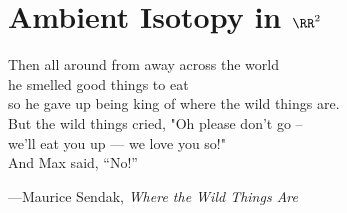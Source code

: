 \chapter{Ambient Isotopy in $\RR^2$}\label{chap:ambient-isotopy-in-r2}

\setlength{}
\epigraph{Then all around from away across the world\\
  he smelled good things to eat\\
  so he gave up being king of where the wild things are.\\
  But the wild things cried, "Oh please don't go --\\
  we'll eat you up --- we love you so!"\\
  And Max said, ``No!''}{---Maurice Sendak, \emph{Where the Wild
    Things Are}}





